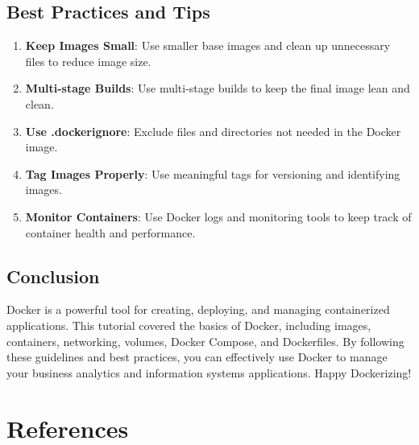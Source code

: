 \documentclass[
  letterpaper,
  DIV=11,
  numbers=noendperiod]{scrreprt}
\providecommand{\tightlist}{%
  \setlength{\itemsep}{0pt}\setlength{\parskip}{0pt}}\usepackage{longtable,booktabs,array}
\newlength{\cslhangindent}
\newenvironment{CSLReferences}[2] %
 {\begin{list}{}{%
  \setlength{\itemindent}{0pt}
  \setlength{\leftmargin}{0pt}
  \setlength{\parsep}{0pt}
  \ifodd #1
   \setlength{\leftmargin}{\cslhangindent}
   \setlength{\itemindent}{-1\cslhangindent}
  \fi
  \setlength{\itemsep}{#2\baselineskip}}}
 {\end{list}}
\begin{document}
\section{Best Practices and Tips}\label{best-practices-and-tips}

\begin{enumerate}
\def\labelenumi{\arabic{enumi}.}
\tightlist
\item
  \textbf{Keep Images Small}: Use smaller base images and clean up
  unnecessary files to reduce image size.
\item
  \textbf{Multi-stage Builds}: Use multi-stage builds to keep the final
  image lean and clean.
\item
  \textbf{Use .dockerignore}: Exclude files and directories not needed
  in the Docker image.
\item
  \textbf{Tag Images Properly}: Use meaningful tags for versioning and
  identifying images.
\item
  \textbf{Monitor Containers}: Use Docker logs and monitoring tools to
  keep track of container health and performance.
\end{enumerate}

\section{Conclusion}\label{conclusion-61}

Docker is a powerful tool for creating, deploying, and managing
containerized applications. This tutorial covered the basics of Docker,
including images, containers, networking, volumes, Docker Compose, and
Dockerfiles. By following these guidelines and best practices, you can
effectively use Docker to manage your business analytics and information
systems applications. Happy Dockerizing!


\chapter*{References}\label{references}


\label{refs}
\begin{CSLReferences}{0}{1}
\end{CSLReferences}
\end{document}
